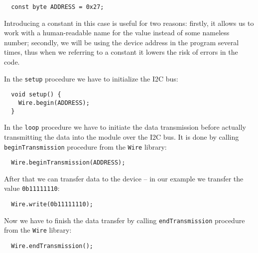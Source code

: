 \documentclass[../sparc.tex]{subfiles}
\begin{document}
\begin{verbatim}
  const byte ADDRESS = 0x27;
\end{verbatim}

Introducing a constant in this case is useful for two reasons: firstly, it
allows us to work with a human-readable name for the value instead of some
nameless number; secondly, we will be using the device address in the program
several times, thus when we referring to a constant it lowers the risk of errors
in the code.

In the \texttt{setup} procedure we have to initialize the I2C bus:

\begin{verbatim}
  void setup() {
    Wire.begin(ADDRESS);
  }
\end{verbatim}

In the \texttt{loop} procedure we have to initiate the data transmission before
actually transmitting the data into the module over the I2C bus.  It is done by
calling \texttt{beginTransmission} procedure from the \texttt{Wire} library:

\begin{verbatim}
  Wire.beginTransmission(ADDRESS);
\end{verbatim}

After that we can transfer data to the device -- in our example we transfer the
value \texttt{0b11111110}:

\begin{verbatim}
  Wire.write(0b11111110);
\end{verbatim}

Now we have to finish the data transfer by calling \texttt{endTransmission}
procedure from the \texttt{Wire} library:

\begin{verbatim}
  Wire.endTransmission();
\end{verbatim}
\end{document}
